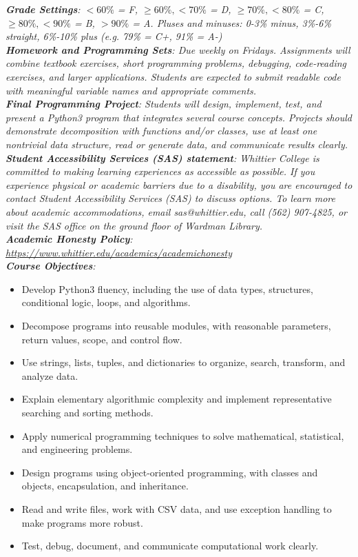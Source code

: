 \documentclass[10pt]{article}
\begin{document}
\noindent
\textit{\textbf{Grade Settings}: $<60\%$ = F, $\geq 60\%,< 70\%$ = D, $\geq 70\%,<80\%$ = C, $\geq 80\%,<90\%$ = B, $>90\%$ = A.  Pluses and minuses: 0-3\% minus, 3\%-6\% straight, 6\%-10\% plus (e.g. 79\% = C+, 91\% = A-)} \\
\textit{\textbf{Homework and Programming Sets}: Due weekly on Fridays. Assignments will combine textbook exercises, short programming problems, debugging, code-reading exercises, and larger applications. Students are expected to submit readable code with meaningful variable names and appropriate comments.} \\
\textit{\textbf{Final Programming Project}: Students will design, implement, test, and present a Python3 program that integrates several course concepts. Projects should demonstrate decomposition with functions and/or classes, use at least one nontrivial data structure, read or generate data, and communicate results clearly.} \\
\textit{\textbf{Student Accessibility Services (SAS) statement}: Whittier College is committed to making learning experiences as accessible as possible. If you experience physical or academic barriers due to a disability, you are encouraged to contact Student Accessibility Services (SAS) to discuss options. To learn more about academic accommodations, email sas@whittier.edu, call (562) 907-4825, or visit the SAS office on the ground floor of Wardman Library.} \\
\textit{\textbf{Academic Honesty Policy}: \url{https://www.whittier.edu/academics/academichonesty}} \\
\clearpage
\noindent
\textit{\textbf{Course Objectives}:}
\begin{itemize}
\item Develop Python3 fluency, including the use of data types, structures, conditional logic, loops, and algorithms.
\item Decompose programs into reusable modules, with reasonable parameters, return values, scope, and control flow.
\item Use strings, lists, tuples, and dictionaries to organize, search, transform, and analyze data.
\item Explain elementary algorithmic complexity and implement representative searching and sorting methods.
\item Apply numerical programming techniques to solve mathematical, statistical, and engineering problems.
\item Design programs using object-oriented programming, with classes and objects, encapsulation, and inheritance.
\item Read and write files, work with CSV data, and use exception handling to make programs more robust.
\item Test, debug, document, and communicate computational work clearly.
\end{itemize}
\end{document}
